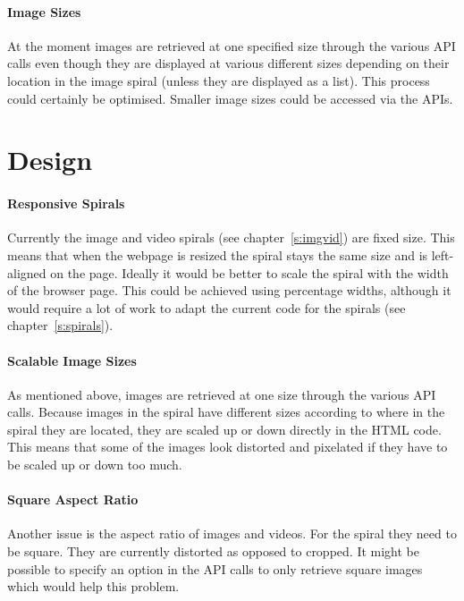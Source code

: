 \paragraph{Image Sizes} 
At the moment images are retrieved at one specified size through the various \ac{API} calls even though they are displayed at various different sizes depending on their location in the image spiral (unless they are displayed as a list). This process could certainly be optimised. Smaller image sizes could be accessed via the \ac{API}s.


\section{Design}

\paragraph{Responsive Spirals} 
Currently the image and video spirals (see chapter~\ref{s:imgvid}) are fixed size. This means that when the webpage is resized the spiral stays the same size and is left-aligned on the page. Ideally it would be better to scale the spiral with the width of the browser page. This could be achieved using percentage widths, although it would require a lot of work to adapt the current code for the spirals (see chapter~\ref{s:spirals}).

\paragraph{Scalable Image Sizes} 
As mentioned above, images are retrieved at one size through the various \ac{API} calls. Because images in the spiral have different sizes according to where in the spiral they are located, they are scaled up or down directly in the \ac{HTML} code. This means that some of the images look distorted and pixelated if they have to be scaled up or down too much.

\paragraph{Square Aspect Ratio} 
Another issue is the aspect ratio of images and videos. For the spiral they need to be square. They are currently distorted as opposed to cropped. It might be possible to specify an option in the \ac{API} calls to only retrieve square images which would help this problem.

